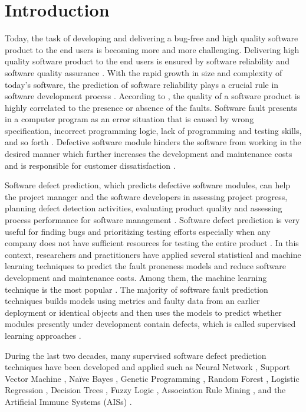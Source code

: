 \documentclass[runningheads,a4paper]{llncs}
\begin{document}
\section{Introduction}

Today, the task of developing and delivering a bug-free and high quality software product to the end users is becoming more and more challenging. Delivering high quality software product to the end users is ensured by software reliability and software quality assurance \cite{rawat2012software}. With the rapid growth in size and complexity of today's software, the prediction of software reliability plays a crucial rule in software development process \cite{zheng2009predicting}. According to \cite{hall2012systematic,arisholm2010systematic}, the quality of a software product is highly correlated to the presence or absence of the faults. Software fault  presents in a computer program as an error situation that is caused by wrong specification, incorrect programming logic, lack of programming and testing skills, and so forth \cite{dowd2006art,abaei2014survey,tomar2016prediction}. Defective software module hinders the software from working in the desired manner which further increases the development and maintenance costs and is responsible for customer dissatisfaction \cite{fenton2000software,fenton2014software}.

Software defect prediction, which predicts defective software modules, can help the project manager and the software developers in assessing project progress, planning defect detection activities, evaluating product quality and assessing process performance for software management \cite{clark2001good}. Software defect prediction is very useful for finding bugs and prioritizing testing efforts especially when any company does not have sufficient resources for testing the entire product \cite{abaei2014survey,wang2016automatically}. In this context, researchers and practitioners have applied several statistical and machine learning techniques to predict the fault proneness models and reduce software development and maintenance costs. Among them, the machine learning technique is the most popular \cite{rawat2012software}. The majority of software fault prediction techniques builds models using metrics and faulty data from an earlier deployment or identical objects and then uses the models to predict whether modules presently under development contain defects, which is called supervised learning approaches \cite{abaei2014survey}.

During the last two decades, many supervised software defect prediction techniques have been developed and applied such as Neural Network \cite{quah2003application}, Support Vector Machine \cite{elish2008predicting}, Naïve Bayes \cite{menzies2007data}, Genetic Programming \cite{evett1998gp}, Random Forest \cite{koru2005building}, Logistic Regression \cite{suffian2014prediction}, Decision Trees \cite{koprinska2007learning}, Fuzzy Logic \cite{yuan2000application}, Association Rule Mining \cite{czibula2014software}, and the Artificial Immune Systems (AISs) \cite{catal2007software2,catal2007software,catal2008fault}. 
\end{document}
